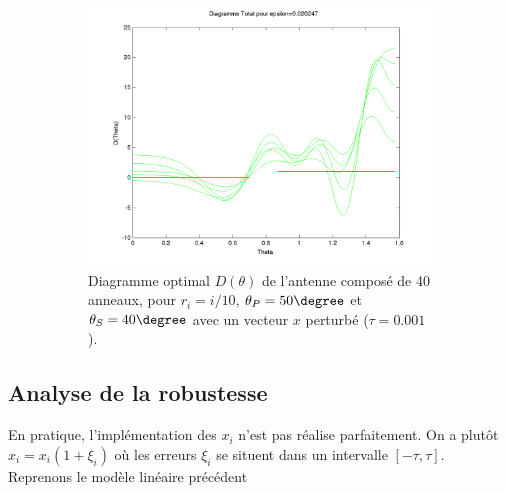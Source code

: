 \begin{figure}[h!]
\begin{subfigure}[b]{0.45\textwidth}
  \label{fig:D-ModLin-RobustTau01}
  \end{subfigure}
  \begin{subfigure}[b]{0.45\textwidth}
  \includegraphics[width=\textwidth]{D-ModLin-2RobustTau001.png}
  \caption{Diagramme optimal $D(\theta)$ de l'antenne composé de 40 anneaux, pour $r_i=i/10$, $\theta_P=50 \degree$ et $\theta_S=40 \degree$ avec un vecteur $x$ perturbé ($\tau=0.001$).}
  \label{fig:D-ModLin-RobustTau001}
  \end{subfigure}
  \caption{}
  \end{figure}


\subsection{Analyse de la robustesse}
En pratique, l'implémentation des $x_i$ n'est pas réalise parfaitement. On a plutôt $\hat{x}_i = x_i(1+\xi_i)$ où les erreurs $\xi_i$ se situent dans un intervalle $[-\tau,\tau]$.\\
Reprenons le modèle linéaire précédent 









